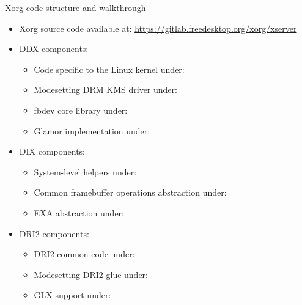 \begin{frame}{Xorg code structure and walkthrough}
  \begin{itemize}
  \item Xorg source code available at: \url{https://gitlab.freedesktop.org/xorg/xserver}
  \item DDX components:
    \begin{itemize}
    \item Code specific to the Linux kernel under: 
    \item Modesetting DRM KMS driver under: 
    \item fbdev core library under: 
    \item Glamor implementation under: 
    \end{itemize}
  \item DIX components:
    \begin{itemize}
    \item System-level helpers under: 
    \item Common framebuffer operations abstraction under: 
    \item EXA abstraction under: 
    \end{itemize}
  \item DRI2 components:
    \begin{itemize}
    \item DRI2 common code under: 
    \item Modesetting DRI2 glue under: 
    \item GLX support under: 
    \end{itemize}
  \end{itemize}
\end{frame}

